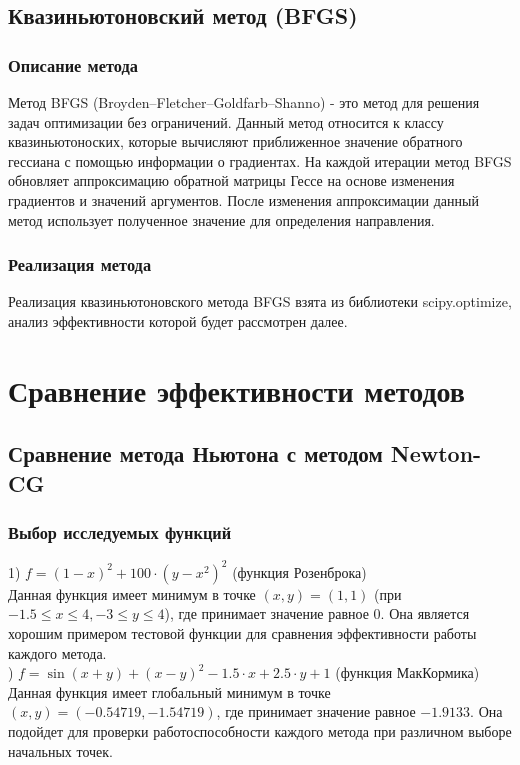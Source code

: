 \documentclass{article}
\begin{document}
\subsection*{Квазиньютоновский метод (BFGS)}
\subsubsection*{Описание метода}
Метод BFGS (Broyden–Fletcher–Goldfarb–Shanno) - это метод для решения задач оптимизации без ограничений. Данный метод относится к классу квазиньютоноских, которые вычисляют приближенное значение обратного гессиана с помощью информации о градиентах. На каждой итерации метод BFGS обновляет аппроксимацию обратной матрицы Гессе на основе изменения градиентов и значений аргументов. После изменения аппроксимации данный метод использует полученное значение для определения направления. 
\subsubsection*{Реализация метода}
Реализация квазиньютоновского метода BFGS взята из библиотеки scipy.optimize, анализ эффективности которой будет рассмотрен далее.

\newpage
\section*{Сравнение эффективности методов}
\subsection*{Сравнение метода Ньютона с методом Newton-CG}
\subsubsection*{Выбор исследуемых функций}
1) $f = (1 - x)^{2} + 100 \cdot (y - x^{2})^{2}$ (функция Розенброка) \\

\noindent Данная функция имеет минимум в точке $(x, y) = (1, 1)$ (при $-1.5 \leq x \leq 4, -3 \leq y \leq 4$), где принимает значение равное $0$. Она является хорошим примером тестовой функции для сравнения эффективности работы каждого метода. \\

) $f = \sin(x + y) + (x - y)^2 - 1.5 \cdot x + 2.5 \cdot y + 1$ (функция МакКормика) \\

\noindent Данная функция имеет глобальный минимум в точке $(x, y) = (-0.54719, -1.54719)$, где принимает значение равное $-1.9133$. Она подойдет для проверки работоспособности каждого метода при различном выборе начальных точек.
\end{document}
